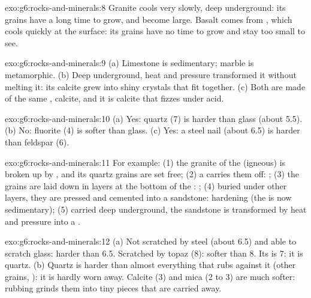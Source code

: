 \begin{solution}{exo:g6:rocks-and-minerals:8}
Granite cools very slowly, deep underground: its grains have a long time
to grow, and become large. Basalt comes from , which cools quickly at
the surface: its grains have no time to grow and stay too small to see.
\end{solution}

\begin{solution}{exo:g6:rocks-and-minerals:9}
(a) Limestone is sedimentary; marble is metamorphic. (b) Deep underground,
heat and pressure transformed it without melting it: its calcite grew into
shiny crystals that fit together. (c) Both are made of the same ,
calcite, and it is calcite that fizzes under acid.
\end{solution}

\begin{solution}{exo:g6:rocks-and-minerals:10}
(a) Yes: quartz (7) is harder than glass (about 5.5). (b) No: fluorite (4)
is softer than glass. (c) Yes: a steel nail (about 6.5) is harder than
feldspar (6).
\end{solution}

\begin{solution}{exo:g6:rocks-and-minerals:11}
For example: (1) the granite of the  (igneous) is broken up by
, and its quartz grains are set free; (2) a  carries them
off: ; (3) the grains are laid down in layers at the bottom of the
: ; (4) buried under other layers, they are pressed and
cemented into a sandstone: hardening (the  is now sedimentary);
(5) carried deep underground, the sandstone is transformed by heat and
pressure into a .
\end{solution}

\begin{solution}{exo:g6:rocks-and-minerals:12}
(a) Not scratched by steel (about 6.5) and able to scratch glass: harder
than 6.5. Scratched by topaz (8): softer than 8. Its  is 7: it is
quartz. (b) Quartz is harder than almost everything that rubs against it
(other grains, ): it is hardly worn away. Calcite (3) and mica
(2 to 3) are much softer: rubbing grinds them into tiny pieces that are
carried away.
\end{solution}

